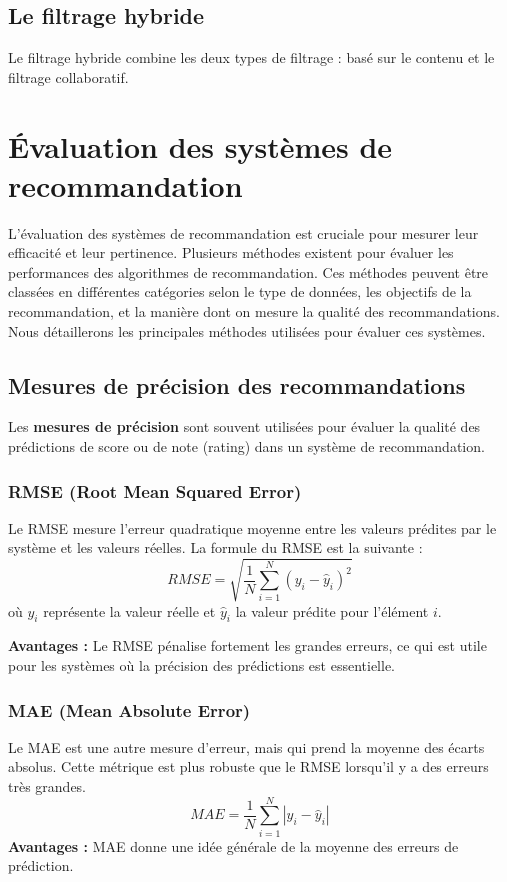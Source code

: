 \subsection{Le filtrage hybride}

Le filtrage hybride combine les deux types de filtrage : basé sur le contenu et le filtrage collaboratif.
 
\section{Évaluation des systèmes de recommandation}

L’évaluation des systèmes de recommandation est cruciale pour mesurer leur efficacité et leur pertinence. Plusieurs méthodes existent pour évaluer les performances des algorithmes de recommandation. Ces méthodes peuvent être classées en différentes catégories selon le type de données, les objectifs de la recommandation, et la manière dont on mesure la qualité des recommandations. Nous détaillerons les principales méthodes utilisées pour évaluer ces systèmes.

\subsection{Mesures de précision des recommandations}

Les \textbf{mesures de précision} sont souvent utilisées pour évaluer la qualité des prédictions de score ou de note (rating) dans un système de recommandation.

\subsubsection{RMSE (Root Mean Squared Error)}
Le RMSE mesure l’erreur quadratique moyenne entre les valeurs prédites par le système et les valeurs réelles. La formule du RMSE est la suivante :
\[
RMSE = \sqrt{\frac{1}{N} \sum_{i=1}^{N} (y_i - \hat{y}_i)^2}
\]
où \(y_i\) représente la valeur réelle et \(\hat{y}_i\) la valeur prédite pour l’élément \(i\).

\textbf{Avantages :} Le RMSE pénalise fortement les grandes erreurs, ce qui est utile pour les systèmes où la précision des prédictions est essentielle.

\subsubsection{MAE (Mean Absolute Error)}
Le MAE est une autre mesure d'erreur, mais qui prend la moyenne des écarts absolus. Cette métrique est plus robuste que le RMSE lorsqu'il y a des erreurs très grandes.
\[
MAE = \frac{1}{N} \sum_{i=1}^{N} |y_i - \hat{y}_i|
\]
\textbf{Avantages :} MAE donne une idée générale de la moyenne des erreurs de prédiction.

